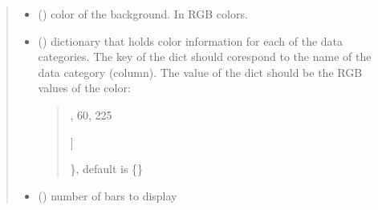\documentclass[letterpaper,10pt,english]{sphinxmanual}
\begin{document}
\begin{fulllineitems}
\begin{quote}
\begin{description}
\begin{itemize}
\item {} 
\sphinxAtStartPar
{} (\sphinxstyleliteralemphasis{\sphinxupquote{ (}}\sphinxstyleliteralemphasis{\sphinxupquote{, }}\sphinxstyleliteralemphasis{\sphinxupquote{, }}\sphinxstyleliteralemphasis{\sphinxupquote{)}}) \textendash{} color of the background. In RGB colors.

\item {} 
\sphinxAtStartPar
{} () \textendash{} 
\sphinxAtStartPar
dictionary that holds color information for each of the data categories. The key of the dict should
corespond to the name of the data category (column). The value of the dict should be the RGB values of the color:
\begin{quote}
\begin{description}
\sphinxlineitem{\{}\begin{description}
\sphinxlineitem{“United States”: {[}}
,
60,
225

\end{description}

\sphinxAtStartPar
{]}

\end{description}

\sphinxAtStartPar
\}, default is \{\}
\end{quote}


\item {} 
\sphinxAtStartPar
{} () \textendash{} number of bars to display

\end{itemize}

\end{description}\end{quote}

\end{fulllineitems}

\end{document}
